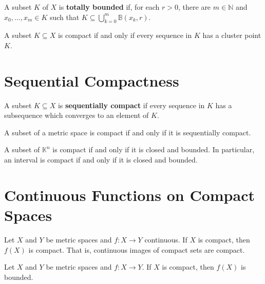 \begin{definition}
    A subset \(K\) of \(X\) is \textbf{totally bounded} if, for each \(r > 0\), there are 
    \(m \in \mathbb{N}\) and \(x_0, \ldots, x_m \in K\) such that \(K \subseteq \bigcup_{k=0}^m \mathbb{B}\left(x_k,r\right) \). 
\end{definition}


\begin{theorem}
    A subset \(K \subseteq X\) is compact if and only if every sequence in \(K\) has 
    a cluster point \(K\). 
\end{theorem}


\section{Sequential Compactness}

\begin{definition}
    A subset \(K \subseteq X\) is \textbf{sequentially compact} if every sequence in \(K\)
    has a subsequence which converges to an element of \(K\). 
\end{definition}

\begin{theorem}
    A subset of a metric space is compact if and only if it is sequentially compact. 
\end{theorem}

\begin{theorem}
    A subset of \(\mathbb{K}^n\) is compact if and only if it is closed and bounded. 
    In particular, an interval is compact if and only if it is closed and bounded. 
\end{theorem}

\section{Continuous Functions on Compact Spaces}

\begin{theorem}
    Let \(X\) and \(Y\) be metric spaces and \(f \colon X \to Y\) continuous. If \(X\)
    is compact, then \(f\left(X\right)\) is compact. That is, continuous images of compact
    sets are compact. 
\end{theorem}

\begin{corollary}
    Let \(X\) and \(Y\) be metric spaces and \(f \colon X \to Y\). If \(X\) is compact, 
    then \(f \left(X\right)\) is bounded. 
\end{corollary}

